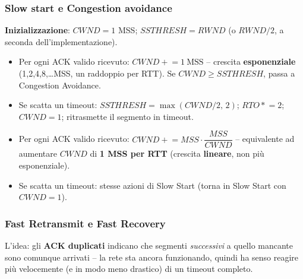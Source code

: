 \documentclass[12pt, a4paper]{article}
\begin{document}
\subsubsection{Slow start e Congestion avoidance}

\begin{tcolorbox}[colback=lightergray!10, colframe=tocsec, title=\textbf{Algoritmo -- Slow start}]
\textbf{Inizializzazione}: $CWND=1$ MSS; $SSTHRESH=RWND$ (o $RWND/2$, a seconda dell'implementazione).
\begin{itemize}
    \item Per ogni ACK valido ricevuto: $CWND \mathrel{+}= 1\ \text{MSS}$ -- crescita \textbf{esponenziale} (1,2,4,8,\dots MSS, un raddoppio per RTT). Se $CWND \geq SSTHRESH$, passa a Congestion Avoidance.
    \item Se scatta un timeout: $SSTHRESH = \max(CWND/2,\, 2)$; $RTO \mathrel{*}= 2$; $CWND=1$; ritrasmette il segmento in timeout.
\end{itemize}
\end{tcolorbox}

\begin{tcolorbox}[colback=lightergray!10, colframe=tocsec, title=\textbf{Algoritmo -- Congestion avoidance}]
\begin{itemize}
    \item Per ogni ACK valido ricevuto: $CWND \mathrel{+}= MSS \cdot \dfrac{MSS}{CWND}$ -- equivalente ad aumentare $CWND$ di \textbf{1 MSS per RTT} (crescita \textbf{lineare}, non più esponenziale).
    \item Se scatta un timeout: stesse azioni di Slow Start (torna in Slow Start con $CWND=1$).
\end{itemize}
\end{tcolorbox}

\subsubsection{Fast Retransmit e Fast Recovery}

L'idea: gli \textbf{ACK duplicati} indicano che segmenti \textit{successivi} a quello mancante sono comunque arrivati -- la rete sta ancora funzionando, quindi ha senso reagire più velocemente (e in modo meno drastico) di un timeout completo.
\end{document}
